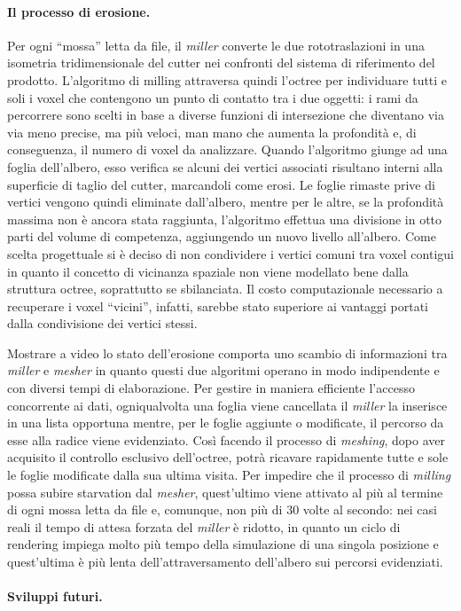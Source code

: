 \paragraph{Il processo di erosione.}
Per ogni ``mossa'' letta da file, il \emph{miller} converte le due rototraslazioni in una isometria tridimensionale del cutter nei confronti del sistema di riferimento del prodotto.  L'algoritmo di milling attraversa quindi l'octree per individuare tutti e soli i voxel che contengono un punto di contatto tra i due oggetti: i rami da percorrere sono scelti in base a diverse funzioni di intersezione che diventano via via meno precise, ma più veloci, man mano che aumenta la profondità e, di conseguenza, il numero di voxel da analizzare. Quando l'algoritmo giunge ad una foglia dell'albero, esso verifica se alcuni dei vertici associati risultano interni alla superficie di taglio del cutter, marcandoli come erosi. Le foglie rimaste prive di vertici vengono quindi eliminate dall'albero, mentre per le altre, se la profondità massima non è ancora stata raggiunta, l'algoritmo effettua una divisione in otto parti del volume di competenza, aggiungendo un nuovo livello all'albero. Come scelta progettuale si è deciso di non condividere i vertici comuni tra voxel contigui in quanto il concetto di vicinanza spaziale non viene modellato bene dalla struttura octree, soprattutto se sbilanciata. Il costo computazionale necessario a recuperare i voxel ``vicini'', infatti, sarebbe stato superiore ai vantaggi portati dalla condivisione dei vertici stessi.

Mostrare a video lo stato dell'erosione comporta uno scambio di informazioni tra \emph{miller} e \emph{mesher} in quanto questi due algoritmi operano in modo indipendente e con diversi tempi di elaborazione. Per gestire in maniera efficiente l'accesso concorrente ai dati, ogniqualvolta una foglia viene cancellata il \emph{miller} la inserisce in una lista opportuna mentre, per le foglie aggiunte o modificate, il percorso da esse alla radice viene evidenziato. Così facendo il processo di \emph{meshing}, dopo aver acquisito il controllo esclusivo dell'octree, potrà ricavare rapidamente tutte e sole le foglie modificate dalla sua ultima visita. Per impedire che il processo di \emph{milling} possa subire starvation dal \emph{mesher}, quest'ultimo viene attivato al più al termine di ogni mossa letta da file e, comunque, non più di 30 volte al secondo: nei casi reali il tempo di attesa forzata del \emph{miller} è ridotto, in quanto un ciclo di rendering impiega molto più tempo della simulazione di una singola posizione e quest'ultima è più lenta dell'attraversamento dell'albero sui percorsi evidenziati.

\paragraph{Sviluppi futuri.}
